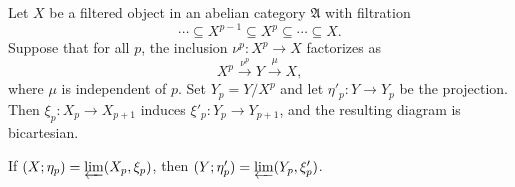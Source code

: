 Let $X$ be a filtered object in an abelian category $\mathfrak{A}$ with filtration
$$\cdots \subseteq X^{p-1} \subseteq X^p \subseteq \cdots \subseteq X.$$
Suppose that for all $p$, the inclusion $\nu^p : X^p \to X$ factorizes as
$$X^p \xrightarrow{\nu^p} Y \xrightarrow{\mu} X,$$
where $\mu$ is independent of $p$. Set $Y_p = Y/X^p$ and let $\eta'_p : Y \to Y_p$ be the projection. Then $\xi_p : X_p \to X_{p+1}$ induces $\xi'_p : Y_p \to Y_{p+1}$, and the resulting diagram is bicartesian.

If $(X; \eta_p) = \varprojlim (X_p, \xi_p)$, then $(Y; \eta'_p) = \varprojlim (Y_p, \xi'_p)$.
